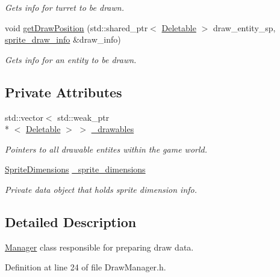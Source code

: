 \begin{DoxyCompactItemize}
\begin{DoxyCompactList}\small\item\em Gets info for turret to be drawn. \end{DoxyCompactList}\item 
void \hyperlink{classDrawManager_a7ca495b3e5f25cbf2d56cc7e48ff3dce}{get\-Draw\-Position} (std\-::shared\-\_\-ptr$<$ \hyperlink{classDeletable}{Deletable} $>$ draw\-\_\-entity\-\_\-sp, \hyperlink{structsprite__draw__info}{sprite\-\_\-draw\-\_\-info} \&draw\-\_\-info)
\begin{DoxyCompactList}\small\item\em Gets info for an entity to be drawn. \end{DoxyCompactList}\end{DoxyCompactItemize}
\subsection*{Private Attributes}
\begin{DoxyCompactItemize}
\item 
std\-::vector$<$ std\-::weak\-\_\-ptr\\*
$<$ \hyperlink{classDeletable}{Deletable} $>$ $>$ \hyperlink{classDrawManager_a87982f3a0af2ece0a3a431a8f2fe4478}{\-\_\-drawables}
\begin{DoxyCompactList}\small\item\em Pointers to all drawable entites within the game world. \end{DoxyCompactList}\item 
\hyperlink{classSpriteDimensions}{Sprite\-Dimensions} \hyperlink{classDrawManager_a2cdf54bc1c47a4683f761af0c8ade8e9}{\-\_\-sprite\-\_\-dimensions}
\begin{DoxyCompactList}\small\item\em Private data object that holds sprite dimension info. \end{DoxyCompactList}\end{DoxyCompactItemize}


\subsection{Detailed Description}
\hyperlink{classManager}{Manager} class responsible for preparing draw data. 

Definition at line 24 of file Draw\-Manager.\-h.



